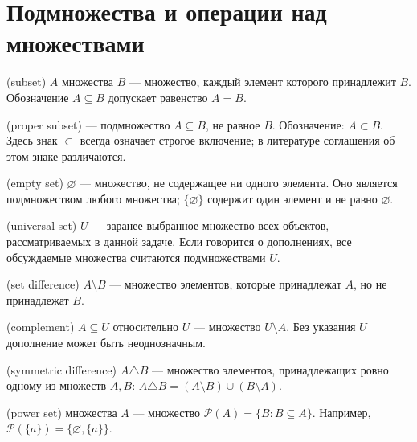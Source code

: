 \section{Подмножества и операции над множествами}
\begin{definition} (subset) \(A\) множества \(B\) — множество, каждый элемент которого принадлежит \(B\). Обозначение \(A\subseteq B\) допускает равенство \(A=B\).\end{definition}
\begin{definition} (proper subset) — подмножество \(A\subseteq B\), не равное \(B\). Обозначение: \(A\subset B\). Здесь знак \(\subset\) всегда означает строгое включение; в литературе соглашения об этом знаке различаются.\end{definition}
\begin{definition} (empty set) \(\varnothing\) — множество, не содержащее ни одного элемента. Оно является подмножеством любого множества; \(\{\varnothing\}\) содержит один элемент и не равно \(\varnothing\).\end{definition}
\begin{definition} (universal set) \(U\) — заранее выбранное множество всех объектов, рассматриваемых в данной задаче. Если говорится о дополнениях, все обсуждаемые множества считаются подмножествами \(U\).\end{definition}
\begin{definition} (set difference) \(A\setminus B\) — множество элементов, которые принадлежат \(A\), но не принадлежат \(B\).\end{definition}
\begin{definition} (complement) \(A\subseteq U\) относительно \(U\) — множество \(U\setminus A\). Без указания \(U\) дополнение может быть неоднозначным.\end{definition}
\begin{definition} (symmetric difference) \(A\triangle B\) — множество элементов, принадлежащих ровно одному из множеств \(A,B\): \(A\triangle B=(A\setminus B)\cup(B\setminus A)\).\end{definition}
\begin{definition} (power set) множества \(A\) — множество \(\mathcal P(A)=\{B:B\subseteq A\}\). Например, \(\mathcal P(\{a\})=\{\varnothing,\{a\}\}\).\end{definition}
